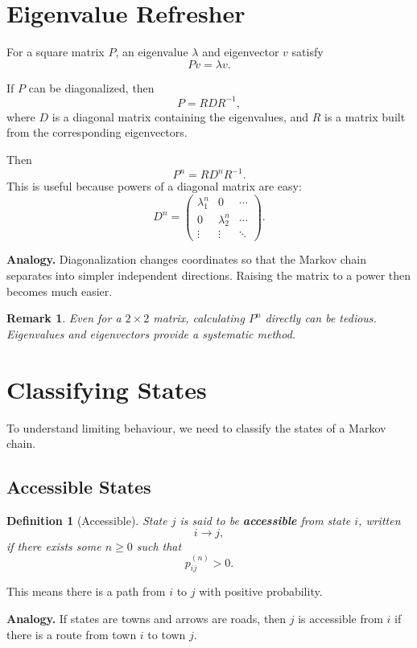 \documentclass[12pt,a4paper]{article}
\theoremstyle{lecturestyle}
\newtheorem{definition}{Definition}
\newtheorem{remark}{Remark}
\begin{document}
\section{Eigenvalue Refresher}

For a square matrix $P$, an eigenvalue $\lambda$ and eigenvector $v$ satisfy
\[
Pv=\lambda v.
\]

If $P$ can be diagonalized, then
\[
P=RDR^{-1},
\]
where $D$ is a diagonal matrix containing the eigenvalues, and $R$ is a matrix built from the corresponding eigenvectors.

Then
\[
P^n=RD^nR^{-1}.
\]
This is useful because powers of a diagonal matrix are easy:
\[
D^n=
\begin{pmatrix}
\lambda_1^n & 0 & \cdots\\
0 & \lambda_2^n & \cdots\\
\vdots & \vdots & \ddots
\end{pmatrix}.
\]

\textbf{Analogy.} Diagonalization changes coordinates so that the Markov chain separates into simpler independent directions. Raising the matrix to a power then becomes much easier.

\begin{remark}
Even for a $2\times 2$ matrix, calculating $P^n$ directly can be tedious. Eigenvalues and eigenvectors provide a systematic method.
\end{remark}

\section{Classifying States}

To understand limiting behaviour, we need to classify the states of a Markov chain.

\subsection{Accessible States}

\begin{definition}[Accessible]
State $j$ is said to be \textbf{accessible} from state $i$, written
\[
i\to j,
\]
if there exists some $n\geq 0$ such that
\[
p_{ij}^{(n)}>0.
\]
\end{definition}

This means there is a path from $i$ to $j$ with positive probability.

\textbf{Analogy.} If states are towns and arrows are roads, then $j$ is accessible from $i$ if there is a route from town $i$ to town $j$.
\end{document}
